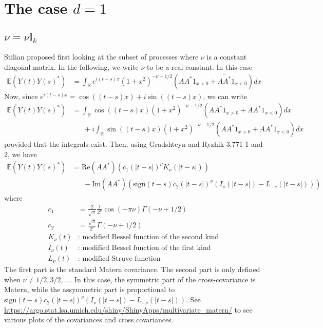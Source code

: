 \documentclass[11pt]{article}
\begin{document}
\section{The case $d=1$}


\subsection{$\nu = \nu \mathbb{I}_k$}

Stilian proposed first looking at the subset of processes where $\nu$ is a constant diagonal matrix. In the following, we write $\nu$ to be a real constant. In this case \begin{align*}
\mathbb{E}\left(Y(t) Y(s)^*\right)&=\int_\mathbb{R} e^{i(t-s)x}(1 + x^2)^{-\nu - 1/2}(AA^*1_{x> 0} + \overline{AA^*}1_{x < 0}) dx
\end{align*}
Now, since $e^{i(t-s)x} = \cos((t -s) x) + i \sin( (t-s) x)$, we can write \begin{align*}
\mathbb{E}\left(Y(t) Y(s)^*\right) &= \int_\mathbb{R} \cos((t -s)  x) (1 + x^2)^{-\nu - 1/2}(AA^*1_{x> 0} + \overline{AA^*}1_{x < 0}) dx \\
& \ \ \ \ \ \ \ +i\int_\mathbb{R} \sin((t -s) x) (1 + x^2)^{-\nu - 1/2}(AA^*1_{x> 0} + \overline{AA^*}1_{x < 0}) dx
\end{align*}provided that the integrals exist. Then, using Gradshteyn and Ryzhik 3.771 1 and 2, we have \begin{align*}
\mathbb{E}\left(Y(t) Y(s)^*\right) &= \textrm{Re}(AA^*)\left(c_1\left(|t-s|\right)^{\nu} K_{\nu}(|t-s|) \right)\\
& \ \ \ \ \ \ \ -\textrm{Im}(AA^*)\left(\textrm{sign}(t-s)c_2\left(|t-s|\right)^{\nu} \left(I_{\nu}(|t-s|) - L_{-\nu}(|t-s|)\right) \right)
\end{align*}where  \begin{align*}
c_1 &= \frac{2}{\sqrt{\pi}} \frac{1}{2^\nu}\cos(-\pi \nu) \Gamma(-\nu + 1/2)\\
c_2 &=  \frac{\sqrt{\pi}}{2^\nu}\Gamma(-\nu + 1/2)\\
K_\nu(t) &: \textrm{ modified Bessel function of the second kind}\\
I_\nu(t) &: \textrm{ modified Bessel function of the first kind}\\
L_\nu(t) &: \textrm{ modified Struve function}
\end{align*}The first part is the standard Matern covariance. The second part is only defined when $\nu \neq 1/2, 3/2, \dots$. In this case, the symmetric part of the cross-covariance is Matern, while the assymmetric part is proportional to $\textrm{sign}(t-s)c_2\left(|t-s|\right)^{\nu} \left(I_{\nu}(|t-s|) - L_{-\nu}(|t-s|)\right)$. See \url{https://argo.stat.lsa.umich.edu/shiny/ShinyApps/multivariate_matern/} to see various plots of the covariances and cross covariances.
\end{document}
